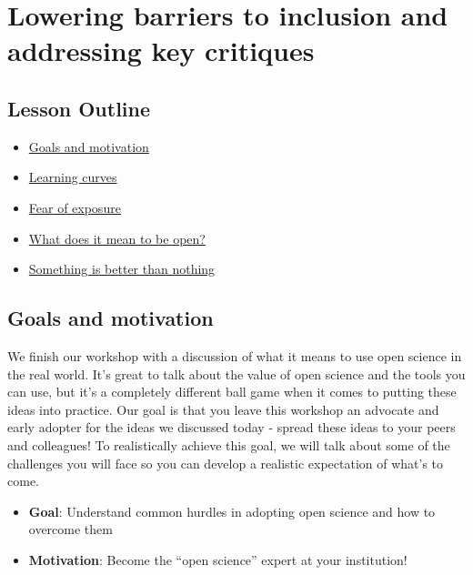 \documentclass[
  letterpaper,
  DIV=11,
  numbers=noendperiod]{scrreprt}
\providecommand{\tightlist}{%
  \setlength{\itemsep}{0pt}\setlength{\parskip}{0pt}}\usepackage{longtable,booktabs,array}
\begin{document}

\hypertarget{implement}{%
\chapter{Lowering barriers to inclusion and addressing key
critiques}\label{implement}}

\hypertarget{lesson-outline-3}{%
\section{Lesson Outline}\label{lesson-outline-3}}

\begin{itemize}
\tightlist
\item
  \protect\hyperlink{goals-and-motivation-3}{Goals and motivation}
\item
  \protect\hyperlink{learning-curves}{Learning curves}
\item
  \protect\hyperlink{fear-of-exposure}{Fear of exposure}
\item
  \protect\hyperlink{what-does-it-mean-to-be-open}{What does it mean to
  be open?}
\item
  \protect\hyperlink{something-is-better-than-nothing}{Something is
  better than nothing}
\end{itemize}

\hypertarget{goals-and-motivation-3}{%
\section{Goals and motivation}\label{goals-and-motivation-3}}

We finish our workshop with a discussion of what it means to use open
science in the real world. It's great to talk about the value of open
science and the tools you can use, but it's a completely different ball
game when it comes to putting these ideas into practice. Our goal is
that you leave this workshop an advocate and early adopter for the ideas
we discussed today - spread these ideas to your peers and colleagues! To
realistically achieve this goal, we will talk about some of the
challenges you will face so you can develop a realistic expectation of
what's to come.

\begin{itemize}
\tightlist
\item
  \textbf{Goal}: Understand common hurdles in adopting open science and
  how to overcome them\\
\item
  \textbf{Motivation}: Become the ``open science'' expert at your
  institution!
\end{itemize}
\end{document}
